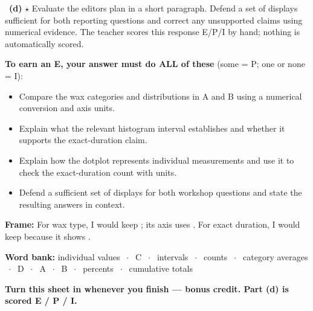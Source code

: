 \documentclass[11pt]{article}
\begin{document}
~\textbf{(d)} $\star$ Evaluate the editor\textquotesingle s plan in a short paragraph. Defend a set of displays sufficient for both reporting questions and correct any unsupported claims using numerical evidence. The teacher scores this response E/P/I by hand; nothing is automatically scored.\par
{\small\textbf{To earn an E, your answer must do ALL of these} (some = P; one or none = I):
\begin{itemize}[leftmargin=1.6em,itemsep=0pt,topsep=1pt,parsep=0pt]
  \item[{\setlength{\fboxsep}{0pt}\fbox{\rule{0pt}{0.65em}\hspace{0.65em}}}] Compare the wax categories and distributions in A and B using a numerical conversion and axis units.
  \item[{\setlength{\fboxsep}{0pt}\fbox{\rule{0pt}{0.65em}\hspace{0.65em}}}] Explain what the relevant histogram interval establishes and whether it supports the exact-duration claim.
  \item[{\setlength{\fboxsep}{0pt}\fbox{\rule{0pt}{0.65em}\hspace{0.65em}}}] Explain how the dotplot represents individual measurements and use it to check the exact-duration count with units.
  \item[{\setlength{\fboxsep}{0pt}\fbox{\rule{0pt}{0.65em}\hspace{0.65em}}}] Defend a sufficient set of displays for both workshop questions and state the resulting answers in context.
\end{itemize}}
\begin{sentenceframebox}[top=3pt,bottom=3pt,before skip=4pt,after skip=4pt]\raggedright\textbf{Frame:} For wax type, I would keep ; its axis uses . For exact duration, I would keep  because it shows .\end{sentenceframebox}

\begin{wordbankbox}[top=3pt,bottom=3pt,before skip=4pt,after skip=4pt]\small\raggedright
\textbf{Word bank:} individual values \ensuremath{\;\cdot\;} C \ensuremath{\;\cdot\;} intervals \ensuremath{\;\cdot\;} counts \ensuremath{\;\cdot\;} category averages \ensuremath{\;\cdot\;} D \ensuremath{\;\cdot\;} A \ensuremath{\;\cdot\;} B \ensuremath{\;\cdot\;} percents \ensuremath{\;\cdot\;} cumulative totals
\end{wordbankbox}



\textbf{Turn this sheet in whenever you finish --- bonus credit. Part (d) is scored E / P / I.}\par

\twopageguard
\end{document}
